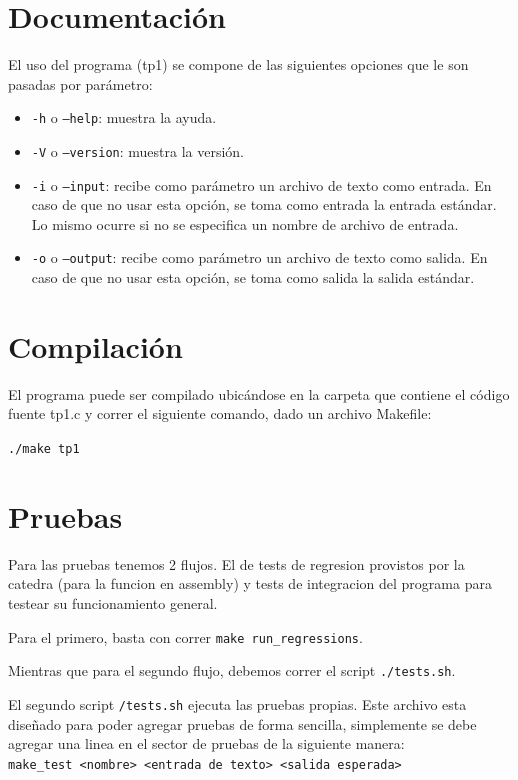 \documentclass[11pt,a4paper]{article}
\begin{document}
\section{Documentación}
El uso del programa (tp1) se compone de las siguientes opciones que le son pasadas por parámetro:
\begin{itemize}
	\item \texttt{-h} o \texttt{--help}: muestra la ayuda.
	\item \texttt{-V} o \texttt{--version}: muestra la versión.
	\item \texttt{-i} o \texttt{--input}: recibe como parámetro un archivo de texto como entrada. En caso de que no usar esta opción, se toma como entrada la entrada estándar. Lo mismo ocurre si no se especifica un nombre de archivo de entrada.
	\item \texttt{-o} o \texttt{--output}: recibe como parámetro un archivo de texto como salida. En caso de que no usar esta opción, se toma como salida la salida estándar.
\end{itemize}

\section{Compilación}
El programa puede ser compilado ubicándose en la carpeta que contiene el código fuente tp1.c y correr el siguiente comando, dado un archivo Makefile:

\texttt{./make tp1}


\section{Pruebas}
Para las pruebas tenemos 2 flujos. El de tests de regresion provistos por la catedra (para la funcion en assembly) y tests de integracion del programa para testear su funcionamiento general.

Para el primero, basta con correr \texttt{make run\_regressions}.

Mientras que para el segundo flujo, debemos correr el script \texttt{./tests.sh}.

El segundo script \texttt{/tests.sh} ejecuta las pruebas propias.
Este archivo esta diseñado para poder agregar pruebas de forma sencilla, simplemente se debe agregar una linea en el sector de pruebas de la siguiente manera:\\

\texttt{make\_test <nombre> <entrada de texto> <salida esperada>}
\end{document}
